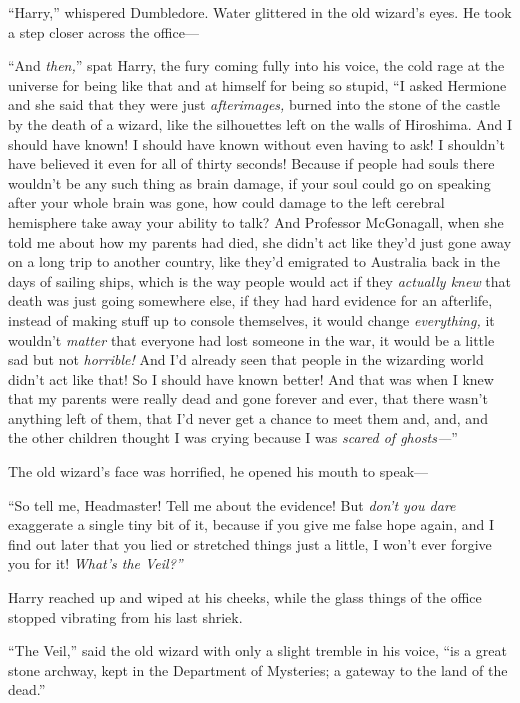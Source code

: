 ``Harry,'' whispered Dumbledore. Water glittered in the old wizard's
eyes. He took a step closer across the office---

``And \emph{then,}'' spat Harry, the fury coming fully into his voice,
the cold rage at the universe for being like that and at himself for
being so stupid, ``I asked Hermione and she said that they were just
\emph{afterimages,} burned into the stone of the castle by the death of
a wizard, like the silhouettes left on the walls of Hiroshima. And I
should have known! I should have known without even having to ask! I
shouldn't have believed it even for all of thirty seconds! Because if
people had souls there wouldn't be any such thing as brain damage, if
your soul could go on speaking after your whole brain was gone, how
could damage to the left cerebral hemisphere take away your ability to
talk? And Professor McGonagall, when she told me about how my parents
had died, she didn't act like they'd just gone away on a long trip to
another country, like they'd emigrated to Australia back in the days of
sailing ships, which is the way people would act if they \emph{actually
knew} that death was just going somewhere else, if they had hard
evidence for an afterlife, instead of making stuff up to console
themselves, it would change \emph{everything,} it wouldn't \emph{matter}
that everyone had lost someone in the war, it would be a little sad but
not \emph{horrible!} And I'd already seen that people in the wizarding
world didn't act like that! So I should have known better! And that was
when I knew that my parents were really dead and gone forever and ever,
that there wasn't anything left of them, that I'd never get a chance to
meet them and, and, and the other children thought I was crying because
I was \emph{scared of ghosts---}''

The old wizard's face was horrified, he opened his mouth to speak---

``So tell me, Headmaster! Tell me about the evidence! But \emph{don't
you dare} exaggerate a single tiny bit of it, because if you give me
false hope again, and I find out later that you lied or stretched things
just a little, I won't ever forgive you for it! \emph{What's the
Veil?''}

Harry reached up and wiped at his cheeks, while the glass things of the
office stopped vibrating from his last shriek.

``The Veil,'' said the old wizard with only a slight tremble in his
voice, ``is a great stone archway, kept in the Department of Mysteries;
a gateway to the land of the dead.''

